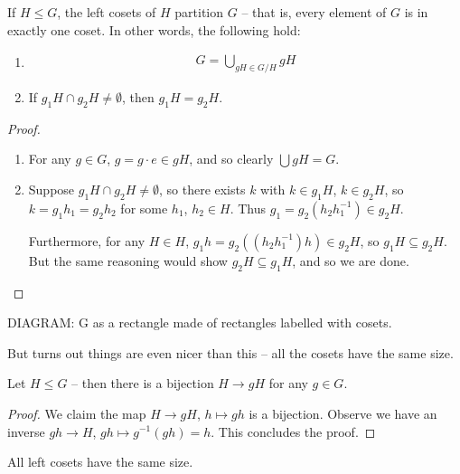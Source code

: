 \documentclass{../template/note}
\begin{document}
    \begin{lemma}
        If \(H \leq G\), the left cosets of \(H\) partition \(G\) -- that is, every element of \(G\) is in exactly one coset. In other words, the following hold:
        \begin{enumerate}
            \item
            \begin{align*}
                G = \bigcup_{gH \in G/H} gH
            \end{align*}
            \item If \(g_1H \cap g_2H \neq \emptyset\), then \(g_1H = g_2H\). 
        \end{enumerate} 
    \end{lemma}
    
    \begin{proof}
        \begin{enumerate}
            \item For any \(g \in G\), \(g = g \cdot e \in gH\), and so clearly \(\bigcup gH = G\).
            \item Suppose \(g_1H \cap g_2H \neq \emptyset\), so there exists \(k\) with \(k \in g_1H\), \(k \in g_2H\), so \(k = g_1h_1 = g_2h_2\) for some \(h_1\), \(h_2 \in H\). Thus \(g_1 = g_2 (h_2h_1^{-1}) \in g_2H\).
            
            Furthermore, for any \(H \in H\), \(g_1h = g_2((h_2h_1^{-1})h) \in g_2H\), so \(g_1H \subseteq g_2H\). But the same reasoning would show \(g_2H \subseteq g_1H\), and so we are done.
        \end{enumerate}
    \end{proof}
    
    DIAGRAM: G as a rectangle made of rectangles labelled with cosets.

    But turns out things are even nicer than this -- all the cosets have the same size.

    \begin{lemma}
        Let \(H \leq G\) -- then there is a bijection \(H \to gH\) for any \(g \in G\).
    \end{lemma}
    
    \begin{proof}
        We claim the map \(H \to gH\), \(h \mapsto gh\) is a bijection. Observe we have an inverse \(gh \to H\), \(gh \mapsto g^{-1}(gh) = h\). This concludes the proof.
    \end{proof}
    
    \begin{corollary}
        All left cosets have the same size.
    \end{corollary}
\end{document}
